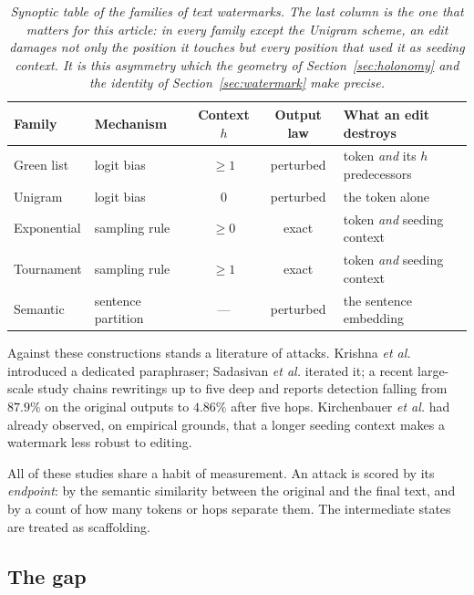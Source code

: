 \documentclass{article}
\theoremstyle{plain}
\theoremstyle{definition}
\numberwithin{equation}{section}
\begin{document}
\begin{table}[t]
\centering
\small
\begin{tabular}{llccl}
\toprule
Family & Mechanism & Context $h$ & Output law & What an edit destroys \\
\midrule
Green list \cite{KGW23} & logit bias & $\ge 1$ & perturbed &
  token \emph{and} its $h$ predecessors \\
Unigram \cite{Zhao24} & logit bias & $0$ & perturbed &
  the token alone \\
Exponential \cite{Kud24,CGZ24} & sampling rule & $\ge 0$ & exact &
  token \emph{and} seeding context \\
Tournament \cite{Dath24} & sampling rule & $\ge 1$ & exact &
  token \emph{and} seeding context \\
Semantic \cite{Hou24a} & sentence partition & --- & perturbed &
  the sentence embedding \\
\bottomrule
\end{tabular}
\caption{\emph{Synoptic table of the families of text watermarks. The
last column is the one that matters for this article: in every family
except the Unigram scheme, an edit damages not only the position it
touches but every position that used it as seeding context. It is this
asymmetry which the geometry of Section~\ref{sec:holonomy} and the
identity of Section~\ref{sec:watermark} make precise.}}
\label{tab:families}
\end{table}

Against these constructions stands a literature of attacks. Krishna
\emph{et al.} \cite{Kri23} introduced a dedicated paraphraser; Sadasivan
\emph{et al.} \cite{Sad23} iterated it; a recent large-scale study
\cite{Chain26} chains rewritings up to five deep and reports detection
falling from $87.9\%$ on the original outputs to $4.86\%$ after five
hops. Kirchenbauer \emph{et al.} \cite{KGW24} had already observed, on
empirical grounds, that a longer seeding context makes a watermark less
robust to editing.

All of these studies share a habit of measurement. An attack is scored
by its \emph{endpoint}: by the semantic similarity between the original
and the final text, and by a count of how many tokens or hops separate
them. The intermediate states are treated as scaffolding.

\subsection*{The gap}
\end{document}
